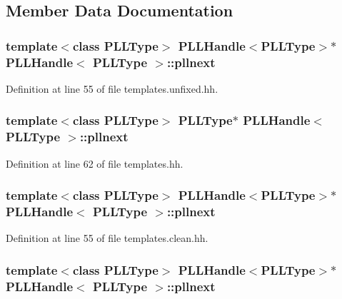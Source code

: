 \subsection{Member Data Documentation}
\subsubsection{\setlength{\rightskip}{0pt plus 5cm}template$<$class PLLType$>$ PLLHandle$<${\bf PLLType}$>$$\ast$ PLLHandle$<$ {\bf PLLType} $>$::pllnext\hspace{0.3cm}{\tt  [protected]}}\label{classPLLHandle_n11}




Definition at line 55 of file templates.unfixed.hh.
\subsubsection{\setlength{\rightskip}{0pt plus 5cm}template$<$class PLLType$>$ {\bf PLLType}$\ast$ PLLHandle$<$ {\bf PLLType} $>$::pllnext\hspace{0.3cm}{\tt  [protected]}}\label{classPLLHandle_n7}




Definition at line 62 of file templates.hh.
\subsubsection{\setlength{\rightskip}{0pt plus 5cm}template$<$class PLLType$>$ PLLHandle$<${\bf PLLType}$>$$\ast$ PLLHandle$<$ {\bf PLLType} $>$::pllnext\hspace{0.3cm}{\tt  [protected]}}\label{classPLLHandle_n4}




Definition at line 55 of file templates.clean.hh.
\subsubsection{\setlength{\rightskip}{0pt plus 5cm}template$<$class PLLType$>$ PLLHandle$<${\bf PLLType}$>$$\ast$ PLLHandle$<$ {\bf PLLType} $>$::pllnext\hspace{0.3cm}{\tt  [protected]}}\label{classPLLHandle_n1}




